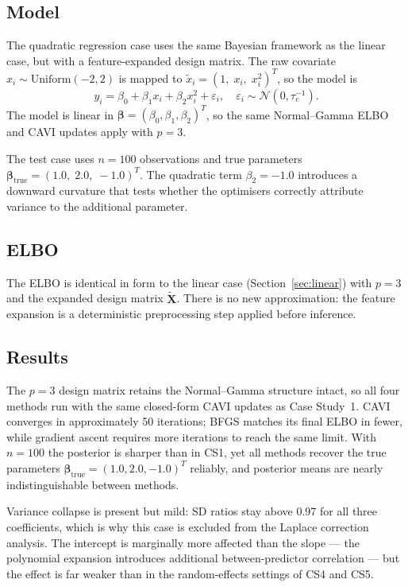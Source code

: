 \documentclass[11pt,a4paper]{article}
\newcommand{\N}{\mathcal{N}}
\begin{document}
\subsection{Model}

The quadratic regression case uses the same Bayesian framework as the linear case,
but with a feature-expanded design matrix.
The raw covariate $x_i \sim \mathrm{Uniform}(-2,2)$ is mapped to
$\tilde{x}_i = (1,\; x_i,\; x_i^2)^T$, so the model is
\begin{equation}
  y_i = \beta_0 + \beta_1 x_i + \beta_2 x_i^2 + \varepsilon_i,
  \quad \varepsilon_i \sim \N(0, \tau_e^{-1}).
\end{equation}
The model is linear in $\bm{\beta} = (\beta_0, \beta_1, \beta_2)^T$, so the same
Normal--Gamma ELBO and CAVI updates apply with $p=3$.

The test case uses $n=100$ observations and true parameters
$\bm{\beta}_{\mathrm{true}} = (1.0,\; 2.0,\; -1.0)^T$.
The quadratic term $\beta_2 = -1.0$ introduces a downward curvature that tests whether
the optimisers correctly attribute variance to the additional parameter.

\subsection{ELBO}

The ELBO is identical in form to the linear case (Section~\ref{sec:linear}) with
$p=3$ and the expanded design matrix $\tilde{\bm{X}}$.
There is no new approximation: the feature expansion is a deterministic preprocessing
step applied before inference.

\subsection{Results}

The $p=3$ design matrix retains the Normal--Gamma structure intact, so all four methods
run with the same closed-form CAVI updates as Case Study~1.
CAVI converges in approximately 50 iterations; BFGS matches its final ELBO in fewer,
while gradient ascent requires more iterations to reach the same limit.
With $n=100$ the posterior is sharper than in CS1, yet all methods recover the true
parameters $\bm{\beta}_{\mathrm{true}} = (1.0, 2.0, -1.0)^T$ reliably, and posterior
means are nearly indistinguishable between methods.

Variance collapse is present but mild: SD ratios stay above 0.97 for all three
coefficients, which is why this case is excluded from the Laplace correction analysis.
The intercept is marginally more affected than the slope --- the polynomial expansion
introduces additional between-predictor correlation --- but the effect is far weaker than
in the random-effects settings of CS4 and CS5.
\end{document}
